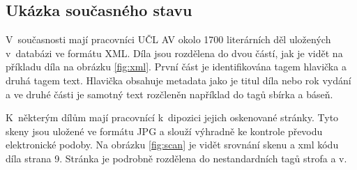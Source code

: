 \documentclass[thesis=B,czech]{FITthesis}[2012/06/26]
\begin{document}
\begin{introduction}
    \section{Ukázka současného stavu}

        V~současnosti mají pracovníci UČL AV okolo 1700 literárních děl uložených v~databázi ve formátu XML. Díla jsou rozdělena do dvou částí, jak je vidět na příkladu díla  na obrázku \ref{fig:xml}. První část je identifikována tagem hlavička a druhá tagem text. Hlavička obsahuje metadata jako je titul díla nebo rok vydání a ve druhé části je samotný text rozčleněn například do tagů sbírka a báseň.
        
        K~některým dílům mají pracovnící k~dipozici jejich oskenované stránky. Tyto skeny jsou uložené ve formátu JPG a slouží výhradně ke kontrole převodu elektronické podoby. Na obrázku \ref{fig:scan} je vidět srovnání skenu a xml kódu díla  strana 9. Stránka je podrobně rozdělena do nestandardních tagů strofa a v.
        
\end{introduction}

    


    





\end{document}
